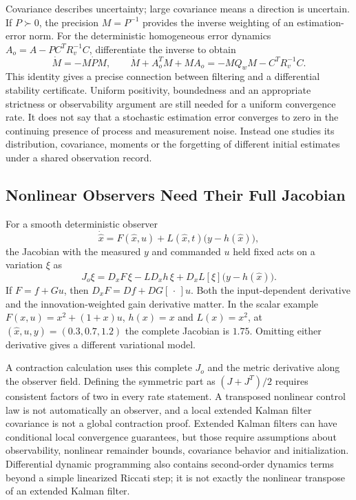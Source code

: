 Covariance describes uncertainty; large covariance means a direction is uncertain. If $P\succ0$, the precision $M=P^{-1}$ provides the inverse weighting of an estimation-error norm. For the deterministic homogeneous error dynamics $A_o=A-PC^TR_v^{-1}C$, differentiate the inverse to obtain
\begin{equation}
\dot M=-M\dot P M,
\qquad
\dot M+A_o^TM+MA_o=-MQ_wM-C^TR_v^{-1}C.
\end{equation}
This identity gives a precise connection between filtering and a differential stability certificate. Uniform positivity, boundedness and an appropriate strictness or observability argument are still needed for a uniform convergence rate. It does not say that a stochastic estimation error converges to zero in the continuing presence of process and measurement noise. Instead one studies its distribution, covariance, moments or the forgetting of different initial estimates under a shared observation record.

\subsection{Nonlinear Observers Need Their Full Jacobian}

For a smooth deterministic observer
\begin{equation}
\dot{\hat x}=F(\hat x,u)+L(\hat x,t)\bigl(y-h(\hat x)\bigr),
\end{equation}
the Jacobian with the measured $y$ and commanded $u$ held fixed acts on a variation $\xi$ as
\begin{equation}
J_o\xi=D_xF\,\xi-LD_xh\,\xi+
D_xL[\xi]\bigl(y-h(\hat x)\bigr).
\end{equation}
If $F=f+Gu$, then $D_xF=Df+DG[\,\cdot\,]u$. Both the input-dependent derivative and the innovation-weighted gain derivative matter. In the scalar example $F(x,u)=x^2+(1+x)u$, $h(x)=x$ and $L(x)=x^2$, at $(\hat x,u,y)=(0.3,0.7,1.2)$ the complete Jacobian is $1.75$. Omitting either derivative gives a different variational model.

A contraction calculation uses this complete $J_o$ and the metric derivative along the observer field. Defining the symmetric part as $(J+J^T)/2$ requires consistent factors of two in every rate statement. A transposed nonlinear control law is not automatically an observer, and a local extended Kalman filter covariance is not a global contraction proof. Extended Kalman filters can have conditional local convergence guarantees, but those require assumptions about observability, nonlinear remainder bounds, covariance behavior and initialization. Differential dynamic programming also contains second-order dynamics terms beyond a simple linearized Riccati step; it is not exactly the nonlinear transpose of an extended Kalman filter.

